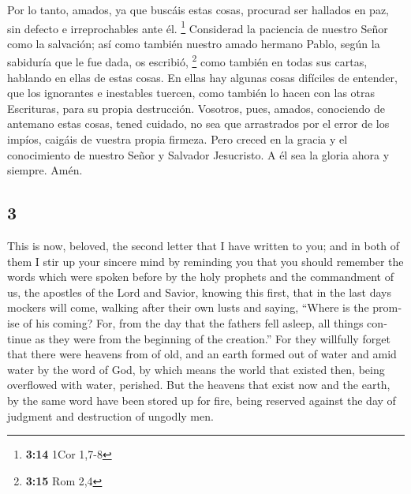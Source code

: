 \begin{paracol}{2}
 Por lo tanto, amados, ya que buscáis estas cosas,
procurad ser hallados en paz, sin defecto e irreprochables ante él.
\footnote{\textbf{3:14} 1Cor 1,7-8}  Considerad la
paciencia de nuestro Señor como la salvación; así como también nuestro
amado hermano Pablo, según la sabiduría que le fue dada, os escribió,
\footnote{\textbf{3:15} Rom 2,4}  como también en todas
sus cartas, hablando en ellas de estas cosas. En ellas hay algunas cosas
difíciles de entender, que los ignorantes e inestables tuercen, como
también lo hacen con las otras Escrituras, para su propia destrucción.
 Vosotros, pues, amados, conociendo de antemano estas
cosas, tened cuidado, no sea que arrastrados por el error de los impíos,
caigáis de vuestra propia firmeza.  Pero creced en la
gracia y el conocimiento de nuestro Señor y Salvador Jesucristo. A él
sea la gloria ahora y siempre. Amén. \switchcolumn
\begin{otherlanguage}{english}

\hypertarget{section-5}{%
\section{3}\label{section-5}}

 This is now, beloved, the second letter that I have
written to you; and in both of them I stir up your sincere mind by
reminding you  that you should remember the words which
were spoken before by the holy prophets and the commandment of us, the
apostles of the Lord and Savior,  knowing this first, that
in the last days mockers will come, walking after their own lusts
 and saying, ``Where is the promise of his coming? For,
from the day that the fathers fell asleep, all things continue as they
were from the beginning of the creation.''  For they
willfully forget that there were heavens from of old, and an earth
formed out of water and amid water by the word of God,  by
which means the world that existed then, being overflowed with water,
perished.  But the heavens that exist now and the earth,
by the same word have been stored up for fire, being reserved against
the day of judgment and destruction of ungodly men.


\end{otherlanguage}
\end{paracol}
